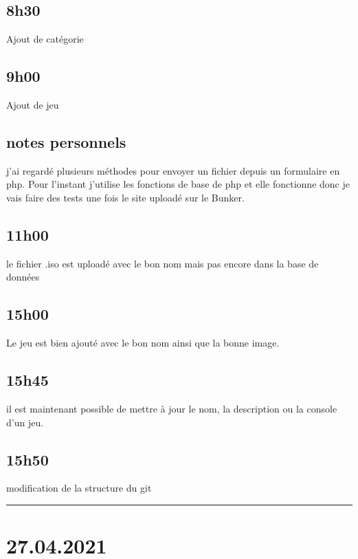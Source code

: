 \documentclass[a4paper,12pt,french]{sphinxmanual}
\begin{document}
\subsection{8h30}
\label{\detokenize{logbook:id29}}
\sphinxAtStartPar
Ajout de catégorie


\subsection{9h00}
\label{\detokenize{logbook:id30}}
\sphinxAtStartPar
Ajout de jeu


\subsection{notes personnels}
\label{\detokenize{logbook:notes-personnels}}
\sphinxAtStartPar
j’ai regardé plusieurs méthodes pour envoyer un fichier depuis un formulaire en php. Pour l’instant j’utilise les fonctions de base de php et elle fonctionne donc je vais faire des tests une fois le site uploadé sur le Bunker.


\subsection{11h00}
\label{\detokenize{logbook:id31}}
\sphinxAtStartPar
le fichier .iso est uploadé avec le bon nom mais pas encore dans la base de données


\subsection{15h00}
\label{\detokenize{logbook:id32}}
\sphinxAtStartPar
Le jeu est bien ajouté avec le bon nom ainsi que la bonne image.


\subsection{15h45}
\label{\detokenize{logbook:h45}}
\sphinxAtStartPar
il est maintenant possible de mettre à jour le nom, la description ou la console d’un jeu.


\subsection{15h50}
\label{\detokenize{logbook:id33}}
\sphinxAtStartPar
modification de la structure du git


\bigskip\hrule\bigskip



\section{27.04.2021}
\label{\detokenize{logbook:id34}}
\end{document}
